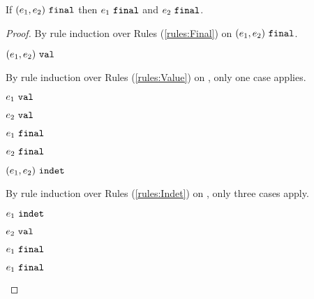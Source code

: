 \begin{lemma}
  \label{lem:pair-final}
  If $(e_1 , e_2) ~\mathtt{final}$ then $e_1 ~\mathtt{final}$ and $e_2 ~\mathtt{final}$.
\end{lemma}
\begin{proof}
By rule induction over Rules (\ref{rules:Final}) on $(e_1 , e_2) ~\mathtt{final}$.
\begin{byCases}
\item[\text{(\ref{rule:FVal})}]
    \begin{pfsteps*}
    \item $(e_1 , e_2) ~\mathtt{val}$  
    \end{pfsteps*}
    By rule induction over Rules (\ref{rules:Value}) on , only one case applies.
    \begin{byCases}
    \item[\text{(\ref{rule:VPair})}]
        \begin{pfsteps*}
        \item $e_1 ~\mathtt{val}$  
        \item $e_2 ~\mathtt{val}$  
        \item $e_1 ~\mathtt{final}$ 
        \item $e_2 ~\mathtt{final}$ 
        \end{pfsteps*}
    \end{byCases}
\item[\text{(\ref{rule:FIndet})}]
    \begin{pfsteps*}
    \item $(e_1 , e_2) ~\mathtt{indet}$  
    \end{pfsteps*}
    By rule induction over Rules (\ref{rules:Indet}) on , only three cases apply.
    \begin{byCases}
    \item[\text{(\ref{rule:IPairL})}]
        \begin{pfsteps*}
        \item $e_1 ~\mathtt{indet}$  
        \item $e_2 ~\mathtt{val}$  
        \item $e_1 ~\mathtt{final}$ 
        \item $e_1 ~\mathtt{final}$ 

\end{pfsteps*}
\end{byCases}
\end{byCases}
\end{proof}
